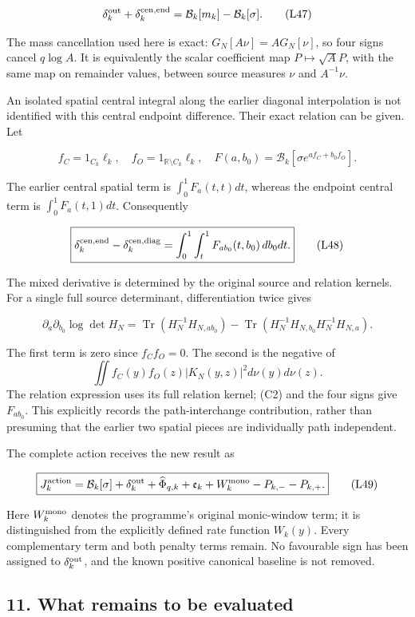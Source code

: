 \documentclass[11pt,a4paper]{article}
\begin{document}
\[
\delta_k^{\rm out}+\delta_k^{\rm cen,end}
=\mathcal B_k[m_k]-\mathcal B_k[\sigma].
\tag{L47}
\]

The mass cancellation used here is exact: \(G_N[A\nu]=A G_N[\nu]\), so four signs cancel \(q\log A\). It is equivalently the scalar coefficient map \(P\mapsto\sqrt A P\), with the same map on remainder values, between source measures \(\nu\) and \(A^{-1}\nu\).

An isolated spatial central integral along the earlier diagonal interpolation is not identified with this central endpoint difference. Their exact relation can be given. Let

\[
f_C=1_{C_k}\ell_k,\quad f_O=1_{\mathbb R\setminus C_k}\ell_k,
\quad F(a,b_0)=\mathcal B_k[\sigma e^{af_C+b_0f_O}].
\]

The earlier central spatial term is \(\int_0^1F_a(t,t)dt\), whereas the endpoint central term is \(\int_0^1F_a(t,1)dt\). Consequently

\[
\boxed{\delta_k^{\rm cen,end}-\delta_k^{\rm cen,diag}
=\int_0^1\int_t^1F_{ab_0}(t,b_0)\,db_0dt.}
\tag{L48}
\]

The mixed derivative is determined by the original source and relation kernels. For a single full source determinant, differentiation twice gives

\[
\partial_a\partial_{b_0}\log\det H_N
=\operatorname{Tr}(H_N^{-1}H_{N,ab_0})
-\operatorname{Tr}(H_N^{-1}H_{N,b_0}H_N^{-1}H_{N,a}).
\]

The first term is zero since \(f_Cf_O=0\). The second is the negative of
\[\iint f_C(y)f_O(z)|K_N(y,z)|^2d\nu(y)d\nu(z).\]
The relation expression uses its full relation kernel; (C2) and the four signs give \(F_{ab_0}\). This explicitly records the path-interchange contribution, rather than presuming that the earlier two spatial pieces are individually path independent.

The complete action receives the new result as

\[
\boxed{J_k^{\rm action}=\mathcal B_k[\sigma]
+\delta_k^{\rm out}+\widehat\Phi_{q,k}
+\mathfrak e_k+W_k^{\rm mono}-P_{k,-}-P_{k,+}.}
\tag{L49}
\]

Here \(W_k^{\rm mono}\) denotes the programme's original monic-window term; it is distinguished from the explicitly defined rate function \(W_k(y)\). Every complementary term and both penalty terms remain. No favourable sign has been assigned to \(\delta_k^{\rm out}\), and the known positive canonical baseline is not removed.

\subsection{11. What remains to be evaluated}\label{loc:what-remains-to-be-evaluated}
\end{document}
